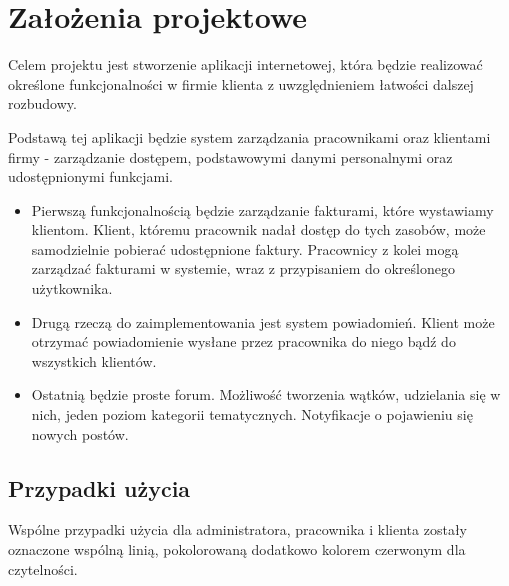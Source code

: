 \documentclass[12pt]{article}
\begin{document}
	\newpage
	
	\section{Założenia projektowe}
	
	Celem projektu jest stworzenie aplikacji internetowej, która będzie realizować określone funkcjonalności w firmie klienta z uwzględnieniem łatwości dalszej rozbudowy.
	
	Podstawą tej aplikacji będzie system zarządzania pracownikami oraz klientami firmy - zarządzanie dostępem, podstawowymi danymi personalnymi oraz udostępnionymi funkcjami.
	
	\begin{itemize}
		\item
		Pierwszą funkcjonalnością będzie zarządzanie fakturami, które wystawiamy klientom. Klient, któremu pracownik nadał dostęp do tych zasobów, może samodzielnie pobierać udostępnione faktury. Pracownicy z kolei mogą zarządzać fakturami w systemie, wraz z przypisaniem do określonego użytkownika.
		\item
		Drugą rzeczą do zaimplementowania jest system powiadomień. Klient może otrzymać powiadomienie wysłane przez pracownika do niego bądź do wszystkich klientów.
		\item
		Ostatnią będzie proste forum. Możliwość tworzenia wątków, udzielania się w nich, jeden poziom kategorii tematycznych. Notyfikacje o pojawieniu się nowych postów.
	\end{itemize}
	
	\subsection{Przypadki użycia}
	
	Wspólne przypadki użycia dla administratora, pracownika i klienta zostały oznaczone wspólną linią, pokolorowaną dodatkowo kolorem czerwonym dla czytelności.
	
\end{document}
